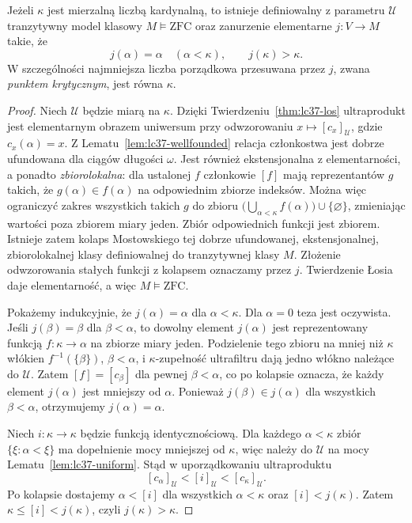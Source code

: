\begin{twierdzenie}
\label{thm:lc37-embedding}
Jeżeli $\kappa$ jest mierzalną liczbą kardynalną,
to istnieje definiowalny z parametru
$\mathcal U$ tranzytywny model klasowy
$M\models\mathrm{ZFC}$ oraz
zanurzenie elementarne $j:V\to M$
takie, że
\[
 j(\alpha)=\alpha\quad(\alpha<\kappa),
 \qquad j(\kappa)>\kappa.
\]
W szczególności najmniejsza liczba
porządkowa przesuwana przez $j$,
zwana \emph{punktem krytycznym},
jest równa $\kappa$.
\end{twierdzenie}
\begin{proof}
Niech $\mathcal U$ będzie miarą na
$\kappa$. Dzięki Twierdzeniu~\ref{thm:lc37-los}
ultraprodukt jest elementarnym obrazem
uniwersum przy odwzorowaniu
$x\mapsto[c_x]_{\mathcal U}$, gdzie
$c_x(\alpha)=x$.
Z Lematu~\ref{lem:lc37-wellfounded}
relacja członkostwa jest dobrze ufundowana
dla ciągów długości $\omega$.
Jest również ekstensjonalna
z elementarności, a ponadto
\emph{zbiorolokalna}: dla ustalonej
$f$ członkowie $[f]$ mają reprezentantów
$g$ takich, że
$g(\alpha)\in f(\alpha)$ na odpowiednim
zbiorze indeksów. Można więc ograniczyć
zakres wszystkich takich $g$ do zbioru
$\bigl(\bigcup_{\alpha<\kappa}f(\alpha)\bigr)
\cup\{\varnothing\}$,
zmieniając wartości poza zbiorem
miary jeden. Zbiór odpowiednich funkcji
jest zbiorem. Istnieje zatem
kolaps Mostowskiego tej dobrze
ufundowanej, ekstensjonalnej,
zbiorolokalnej klasy definiowalnej
do tranzytywnej klasy $M$.
Złożenie odwzorowania stałych funkcji
z kolapsem oznaczamy przez $j$.
Twierdzenie Łosia daje elementarność,
a więc $M\models\mathrm{ZFC}$.

Pokażemy indukcyjnie, że
$j(\alpha)=\alpha$ dla $\alpha<\kappa$.
Dla $\alpha=0$ teza jest oczywista.
Jeśli $j(\beta)=\beta$ dla $\beta<\alpha$,
to dowolny element $j(\alpha)$
jest reprezentowany funkcją
$f:\kappa\to\alpha$ na zbiorze
miary jeden. Podzielenie tego zbioru
na mniej niż $\kappa$ włókien
$f^{-1}(\{\beta\})$, $\beta<\alpha$,
i $\kappa$-zupełność ultrafiltru
dają jedno włókno należące do
$\mathcal U$. Zatem $[f]=[c_\beta]$
dla pewnej $\beta<\alpha$,
co po kolapsie oznacza, że każdy
element $j(\alpha)$ jest mniejszy
od $\alpha$. Ponieważ
$j(\beta)\in j(\alpha)$ dla
wszystkich $\beta<\alpha$,
otrzymujemy $j(\alpha)=\alpha$.

Niech $i:\kappa\to\kappa$
będzie funkcją identycznościową.
Dla każdego $\alpha<\kappa$
zbiór $\{\xi:\alpha<\xi\}$ ma
dopełnienie mocy mniejszej od
$\kappa$, więc należy do $\mathcal U$
na mocy Lematu~\ref{lem:lc37-uniform}.
Stąd w uporządkowaniu ultraproduktu
\[
 [c_\alpha]_{\mathcal U}
 <[i]_{\mathcal U}
 <[c_\kappa]_{\mathcal U}.
\]
Po kolapsie dostajemy
$\alpha<[i]$ dla wszystkich
$\alpha<\kappa$ oraz
$[i]<j(\kappa)$. Zatem
$\kappa\le[i]<j(\kappa)$,
czyli $j(\kappa)>\kappa$.
\end{proof}

